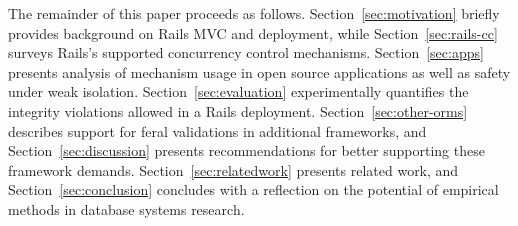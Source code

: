 The remainder of this paper proceeds as
follows. Section~\ref{sec:motivation} briefly provides background on
Rails MVC and deployment, while Section~\ref{sec:rails-cc} surveys
Rails's supported concurrency control
mechanisms. Section~\ref{sec:apps} presents analysis of mechanism
usage in open source applications as well as safety under weak
isolation.  Section~\ref{sec:evaluation} experimentally quantifies the
integrity violations allowed in a Rails
deployment. Section~\ref{sec:other-orms} describes support for feral
validations in additional frameworks, and Section~\ref{sec:discussion}
presents recommendations for better supporting these framework
demands. Section~\ref{sec:relatedwork} presents related work, and
Section~\ref{sec:conclusion} concludes with a reflection on the
potential of empirical methods in database systems research.
